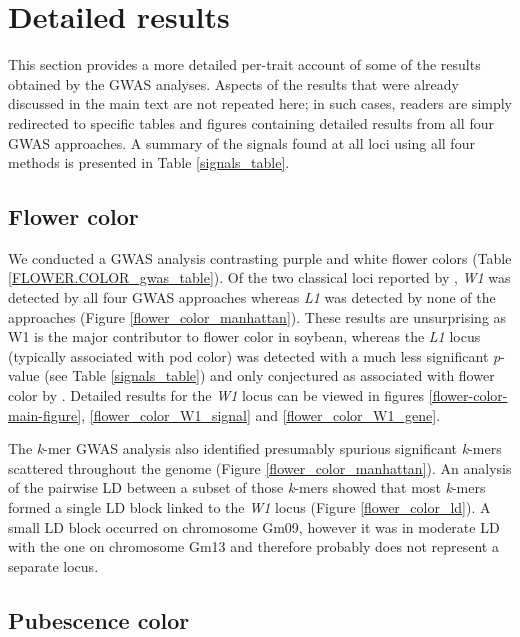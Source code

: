 \section*{Detailed results}
\label{annexe-sv-gwas-detailed-results}

This section provides a more detailed per-trait account of some of the results obtained
by the GWAS analyses. Aspects of the results that were
already discussed in the main text are not repeated here; in such cases,
readers are simply redirected to specific tables and figures containing
detailed results from all four GWAS approaches. A summary of the signals found
at all loci using all four methods is presented in Table \ref{signals_table}.

\subsection*{Flower color}
\label{sv-gwas-flower-color}

We conducted a GWAS analysis contrasting purple and white flower colors
(Table \ref{FLOWER.COLOR_gwas_table}). Of the two classical loci reported by
\cite{bandillo2017}, \textit{W1} was detected by all four GWAS approaches whereas
\textit{L1} was detected by none of the approaches (Figure
\ref{flower_color_manhattan}). These results are unsurprising as W1 is the
major contributor to flower color in soybean, whereas the \textit{L1} locus
(typically associated with pod color) was detected with a much less significant
\textit{p}-value (see Table \ref{signals_table}) and only conjectured as
associated with flower color by \cite{bandillo2017}. Detailed results for the
\textit{W1} locus can be viewed in figures \ref{flower-color-main-figure},
\ref{flower_color_W1_signal} and \ref{flower_color_W1_gene}.

The \textit{k}-mer GWAS analysis also identified presumably spurious significant
\textit{k}-mers scattered throughout the genome (Figure
\ref{flower_color_manhattan}). An analysis of the pairwise LD between a subset
of those \textit{k}-mers showed that most \textit{k}-mers formed a single LD block
linked to the \textit{W1} locus (Figure \ref{flower_color_ld}). A small LD block
occurred on chromosome Gm09, however it was in moderate LD with the one on chromosome
Gm13 and therefore probably does not represent a separate locus.

\subsection*{Pubescence color}
\label{sv-gwas-pubescence-color}

